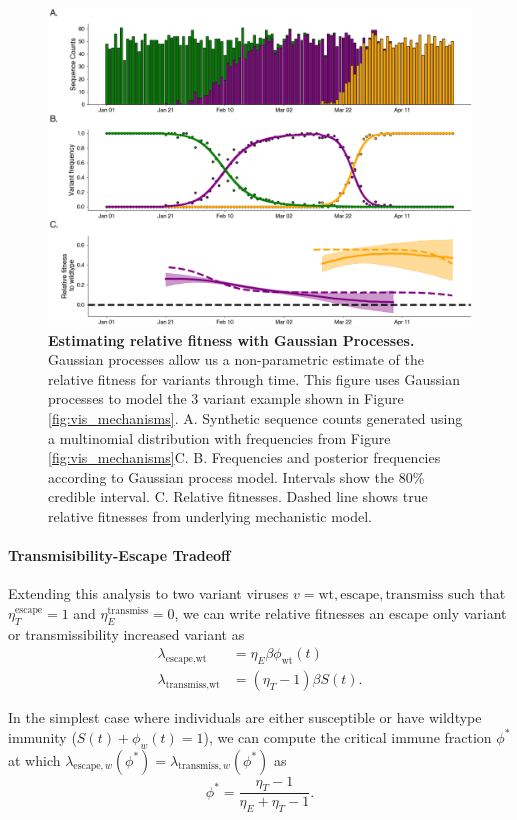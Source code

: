 \documentclass[12pt,oneside,letterpaper]{article}
\newcommand{\wt}{\text{wt}}
\newcommand{\varE}{\text{escape}}
\newcommand{\varT}{\text{transmiss}}
\begin{document}
\begin{figure}[h]
    \centering
    \includegraphics[width=0.8\linewidth]{./figures/gp_example.png}
    \caption{\textbf{Estimating relative fitness with Gaussian Processes.}
    Gaussian processes allow us a non-parametric estimate of the relative fitness for variants through time.
    This figure uses Gaussian processes to model the 3 variant example shown in Figure \ref{fig:vis_mechanisms}.
    A. Synthetic sequence counts generated using a multinomial distribution with frequencies from Figure \ref{fig:vis_mechanisms}C.
    B. Frequencies and posterior frequencies according to Gaussian process model. Intervals show the 80\% credible interval.
    C. Relative fitnesses. Dashed line shows true relative fitnesses from underlying mechanistic model.
}
    \label{fig:gp_example}
\end{figure}


\paragraph{Transmisibility-Escape Tradeoff}%

Extending this analysis to two variant viruses $v= \wt, \varE, \varT$ such that $\eta_{T}^{\varE} = 1$ and $\eta_{E}^{\varT} = 0$, we can write relative fitnesses an escape only variant or transmissibility increased variant as
\begin{align*}
    \lambda_{\varE, \wt} &= \eta_{E} \beta \phi_{\wt}(t)\\
    \lambda_{\varT, \wt} &= (\eta_{T} - 1) \beta S(t).
\end{align*}

In the simplest case where individuals are either susceptible or have wildtype immunity ($S(t) + \phi_{w}(t) = 1$), we can compute the critical immune fraction $\phi^{*}$ at which $\lambda_{\varE, w}(\phi^{*}) = \lambda_{\varT, w}(\phi^{*})$ as
\begin{equation} \label{eq:critical_immunity}
    \phi^{*} = \frac{\eta_{T} - 1}{\eta_{E} + \eta_{T} - 1}.
\end{equation}
\end{document}
